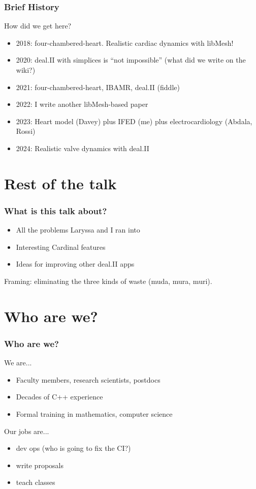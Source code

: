 \documentclass[8pt]{beamer}
\begin{document}
\begin{frame}
    \frametitle{Brief History}
    How did we get here?
    \begin{itemize}
      \item 2018: four-chambered-heart. Realistic cardiac dynamics with libMesh!
      \item 2020: deal.II with simplices is ``not impossible'' (what did we write on the wiki?)
      \item 2021: four-chambered-heart, IBAMR, deal.II (fiddle)
      \item 2022: I write another libMesh-based paper
      \item 2023: Heart model (Davey) plus IFED (me) plus electrocardiology (Abdala, Rossi)
      \item 2024: Realistic valve dynamics with deal.II
    \end{itemize}
\end{frame}

\section{Rest of the talk}
\begin{frame}
  \frametitle{What is this talk about?}
  \begin{itemize}
    \item All the problems Laryssa and I ran into
    \item Interesting Cardinal features
    \item Ideas for improving other deal.II apps
  \end{itemize}

  \vfill

  \begin{center}
    Framing: eliminating the three kinds of waste (muda, mura, muri).
  \end{center}
\end{frame}

\section{Who are we?}
\begin{frame}
    \frametitle{Who are we?}
    We are...
    \begin{itemize}
      \item Faculty members, research scientists, postdocs
      \item Decades of C++ experience
      \item Formal training in mathematics, computer science
    \end{itemize}

    Our jobs are...
    \begin{itemize}
      \item dev ops (who is going to fix the CI?)
      \item write proposals
      \item teach classes
    \end{itemize}
\end{frame}
\end{document}
